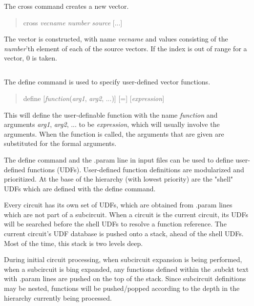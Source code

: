 
The {\cb cross} command creates a new vector.
\begin{quote}\vt
cross {\it vecname number} {\it source} [...]
\end{quote}
The vector is constructed, with name {\it vecname} and values
consisting of the {\it number\/}'th element of each of the source
vectors.  If the index is out of range for a vector, 0 is taken.

\subsection{}


The {\cb define} command is used to specify user-defined vector
functions.
\begin{quote}\vt
define [{\it function\/}({\it arg1\/}, {\it arg2\/}, ...)]
[=] [{\it expression\/}]
\end{quote}
This will define the user-definable function with the name {\it
function\/} and arguments {\it arg1\/}, {\it arg2\/}, ...  to be {\it
expression}, which will usually involve the arguments.  When the
function is called, the arguments that are given are substituted
for the formal arguments.

The {\cb define} command and the {\vt .param} line in input files can
be used to define user-defined functions (UDFs).  User-defined
function definitions are modularized and prioritized.  At the base of
the hierarchy (with lowest priority) are the "shell" UDFs which are
defined with the {\cb define} command.

Every circuit has its own set of UDFs, which are obtained from {\vt
.param} lines which are not part of a subcircuit.  When a circuit is
the current circuit, its UDFs will be searched before the shell UDFs
to resolve a function reference.  The current circuit's UDF database
is pushed onto a stack, ahead of the shell UDFs.  Most of the time,
this stack is two levels deep.

During initial circuit processing, when subcircuit expansion is being
performed, when a subcircuit is bing expanded, any functions defined
within the {\vt .subckt} text with {\vt .param} lines are pushed on
the top of the stack.  Since subcircuit definitions may be nested,
functions will be pushed/popped according to the depth in the
hierarchy currently being processed.
  
